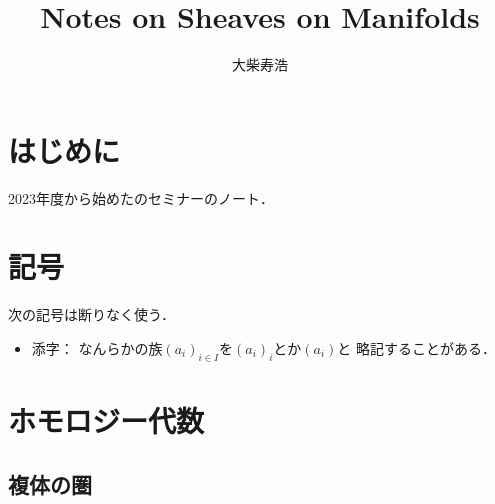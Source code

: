 





\title{Notes on Sheaves on Manifolds}
\author{大柴寿浩}
\date{}

\maketitle

\section*{はじめに}
2023年度から始めた\cite{KS90}のセミナーのノート．

\section*{記号}
次の記号は断りなく使う．
\begin{itemize}
    \item 添字：
    なんらかの族$(a_i)_{i\in I}$を$(a_i)_i$とか$(a_i)$と
    略記することがある．
\end{itemize}
\section{ホモロジー代数}
\setcounter{subsection}{2}

\subsection{複体の圏}

